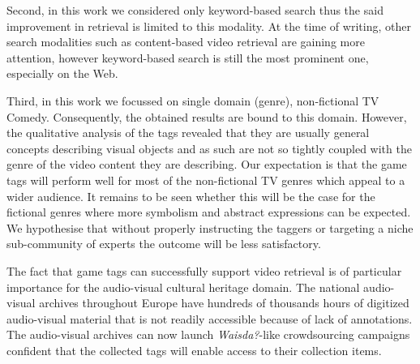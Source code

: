 Second, in this work we considered only keyword-based search thus the said improvement in retrieval is limited to this modality. At the time of writing, other search modalities such as content-based video retrieval are gaining more attention, however keyword-based search is still the most prominent one, especially on the Web.

Third, in this work we focussed on single domain (genre), non-fictional TV Comedy. Consequently, the obtained results are bound to this domain. However, the qualitative analysis of the tags revealed
that they are usually general concepts describing visual objects and as such are not so tightly coupled with the genre of the video content they are describing. Our expectation is that the game tags will
perform well for most of the non-fictional TV genres which appeal to a wider audience. It remains to be seen whether this will be the case for the fictional genres where more symbolism and abstract
expressions can be expected. We hypothesise that without properly instructing the taggers or targeting a niche sub-community of experts the outcome will be less satisfactory.

The fact that game tags can successfully support video retrieval is of particular importance for the audio-visual cultural heritage domain. The national audio-visual archives throughout Europe have hundreds of thousands hours of digitized audio-visual material that is not readily accessible because of lack of annotations. The audio-visual archives can now launch \textit{Waisda?}-like crowdsourcing campaigns confident that the collected tags will enable access to their collection items.